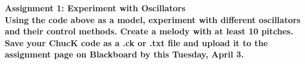 \documentclass{article}
\begin{document}
\textbf{Assignment 1: Experiment with Oscillators}\vspace{2mm}
\\
\textbf{Using the code above as a model, experiment with different oscillators and
their control methods. Create a melody with at least 10 pitches. Save your
ChucK code as a .ck or .txt file and upload it to the assignment page on
Blackboard by this Tuesday, April 3.}
\end{document}

